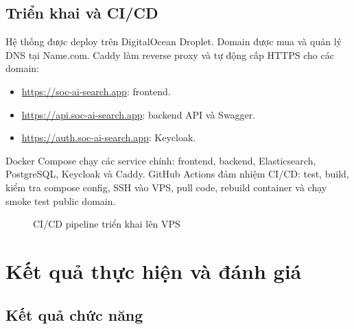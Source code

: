 \documentclass[12pt,a4paper]{report}
\begin{document}
\section{Triển khai và CI/CD}

Hệ thống được deploy trên DigitalOcean Droplet. Domain được mua và quản lý DNS tại Name.com. Caddy làm reverse proxy và tự động cấp HTTPS cho các domain:

\begin{itemize}
    \item \url{https://soc-ai-search.app}: frontend.
    \item \url{https://api.soc-ai-search.app}: backend API và Swagger.
    \item \url{https://auth.soc-ai-search.app}: Keycloak.
\end{itemize}

Docker Compose chạy các service chính: frontend, backend, Elasticsearch, PostgreSQL, Keycloak và Caddy. GitHub Actions đảm nhiệm CI/CD: test, build, kiểm tra compose config, SSH vào VPS, pull code, rebuild container và chạy smoke test public domain.

\begin{figure}[H]
\centering
{}
\caption{CI/CD pipeline triển khai lên VPS}
\label{fig:cicd}
\end{figure}

\chapter{Kết quả thực hiện và đánh giá}

\section{Kết quả chức năng}
\end{document}
